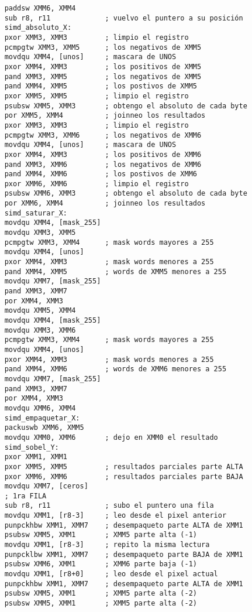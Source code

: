 \begin{verbatim}
    paddsw XMM6, XMM4
    sub r8, r11             ; vuelvo el puntero a su posición
    simd_absoluto_X:
    pxor XMM3, XMM3         ; limpio el registro
    pcmpgtw XMM3, XMM5      ; los negativos de XMM5
    movdqu XMM4, [unos]     ; mascara de UNOS
    pxor XMM4, XMM3         ; los positivos de XMM5
    pand XMM3, XMM5         ; los negativos de XMM5
    pand XMM4, XMM5         ; los postivos de XMM5
    pxor XMM5, XMM5         ; limpio el registro
    psubsw XMM5, XMM3       ; obtengo el absoluto de cada byte
    por XMM5, XMM4          ; joinneo los resultados
    pxor XMM3, XMM3         ; limpio el registro
    pcmpgtw XMM3, XMM6      ; los negativos de XMM6
    movdqu XMM4, [unos]     ; mascara de UNOS
    pxor XMM4, XMM3         ; los positivos de XMM6
    pand XMM3, XMM6         ; los negativos de XMM6
    pand XMM4, XMM6         ; los postivos de XMM6
    pxor XMM6, XMM6         ; limpio el registro
    psubsw XMM6, XMM3       ; obtengo el absoluto de cada byte
    por XMM6, XMM4          ; joinneo los resultados
    simd_saturar_X:
    movdqu XMM4, [mask_255]
    movdqu XMM3, XMM5
    pcmpgtw XMM3, XMM4      ; mask words mayores a 255
    movdqu XMM4, [unos]
    pxor XMM4, XMM3         ; mask words menores a 255
    pand XMM4, XMM5         ; words de XMM5 menores a 255
    movdqu XMM7, [mask_255]
    pand XMM3, XMM7
    por XMM4, XMM3
    movdqu XMM5, XMM4
    movdqu XMM4, [mask_255]
    movdqu XMM3, XMM6
    pcmpgtw XMM3, XMM4      ; mask words mayores a 255
    movdqu XMM4, [unos]
    pxor XMM4, XMM3         ; mask words menores a 255
    pand XMM4, XMM6         ; words de XMM6 menores a 255
    movdqu XMM7, [mask_255]
    pand XMM3, XMM7
    por XMM4, XMM3
    movdqu XMM6, XMM4
    simd_empaquetar_X:
    packuswb XMM6, XMM5
    movdqu XMM0, XMM6       ; dejo en XMM0 el resultado
    simd_sobel_Y:
    pxor XMM1, XMM1
    pxor XMM5, XMM5         ; resultados parciales parte ALTA
    pxor XMM6, XMM6         ; resultados parciales parte BAJA
    movdqu XMM7, [ceros]
    ; 1ra FILA
    sub r8, r11             ; subo el puntero una fila
    movdqu XMM1, [r8-3]     ; leo desde el pixel anterior
    punpckhbw XMM1, XMM7    ; desempaqueto parte ALTA de XMM1
    psubsw XMM5, XMM1       ; XMM5 parte alta (-1)
    movdqu XMM1, [r8-3]     ; repito la misma lectura
    punpcklbw XMM1, XMM7    ; desempaqueto parte BAJA de XMM1
    psubsw XMM6, XMM1       ; XMM6 parte baja (-1)
    movdqu XMM1, [r8+0]     ; leo desde el pixel actual
    punpckhbw XMM1, XMM7    ; desempaqueto parte ALTA de XMM1
    psubsw XMM5, XMM1       ; XMM5 parte alta (-2)
    psubsw XMM5, XMM1       ; XMM5 parte alta (-2)

\end{verbatim}
